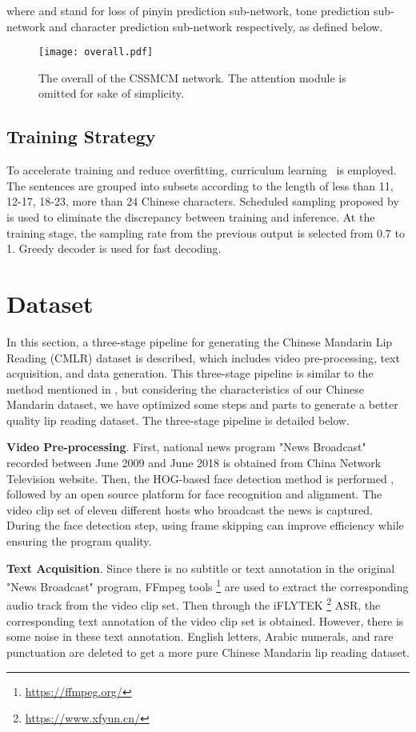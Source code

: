 \documentclass[sigconf]{acmart}
\begin{document}
where  and  stand for loss of pinyin prediction sub-network, tone prediction sub-network and character prediction sub-network respectively, as defined below.


\begin{figure}
\centering
\texttt{[image: overall.pdf]}
\caption{The overall of the CSSMCM network. The attention module is omitted for sake of simplicity.}\label{fig:overall}
\end{figure}

\subsection{Training Strategy}
To accelerate training and reduce overfitting, curriculum learning~\cite{chung2017lipWild} is employed. The sentences are grouped into subsets according to the length of less than 11, 12-17, 18-23, more than 24 Chinese characters. Scheduled sampling proposed by \cite{bengio2015scheduled} is used to eliminate the discrepancy between training and inference. At the training stage, the sampling rate from the previous output is selected from 0.7 to 1. Greedy decoder is used for fast decoding.


\section{Dataset}
In this section, a three-stage pipeline for generating the Chinese Mandarin Lip Reading (CMLR) dataset is described, which includes video pre-processing, text acquisition, and data generation. This three-stage pipeline is similar to the method mentioned in \cite{chung2017lipWild}, but considering the characteristics of our Chinese Mandarin dataset, we have optimized some steps and parts to generate a better quality lip reading dataset. The three-stage pipeline is detailed below.

\textbf{Video Pre-processing}. 
First, national news program "News Broadcast" recorded between June 2009 and June 2018 is obtained from China Network Television website. Then, the HOG-based face detection method is performed \cite{king2009dlib}, followed by an open source platform for face recognition and alignment. The video clip set of eleven different hosts who broadcast the news is captured. During the face detection step, using frame skipping can improve efficiency while ensuring the program quality.

\textbf{Text Acquisition}. 
Since there is no subtitle or text annotation in the original "News Broadcast" program, FFmpeg tools \footnote{\url{https://ffmpeg.org/}} are used to extract the corresponding audio track from the video clip set. 
Then through the iFLYTEK \footnote{\url{https://www.xfyun.cn/}} ASR, the corresponding text annotation of the video clip set is obtained. However, there is some noise in these text annotation. English letters, Arabic numerals, and rare punctuation are deleted to get a more pure Chinese Mandarin lip reading dataset.
\end{document}
